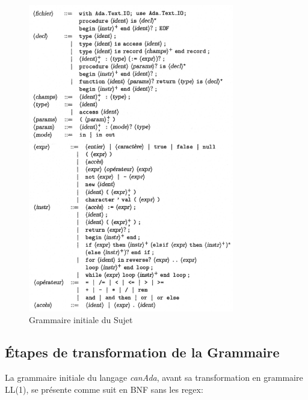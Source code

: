 \documentclass[french,a4paper]{article}
\begin{document}
    \begin{figure}[H]
        \centering
        \includegraphics[width=0.8\textwidth]{grammaire_init}
        \caption{Grammaire initiale du Sujet}\label{fig:figure}
    \end{figure}

    \subsection{Étapes de transformation de la Grammaire}\label{subsec:etapes-de-transformation-de-la-grammaire}

    \label{subsec:grammaire-originale-en-bnf}

    La grammaire initiale du langage \textit{canAda}, avant sa transformation en grammaire LL(1), se présente comme suit en BNF sans les regex:
\end{document}
